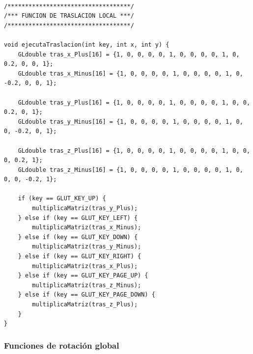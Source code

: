 \documentclass[12pt,a4paper]{article}
\begin{document}
\begin{lstlisting}

/***********************************/
/*** FUNCION DE TRASLACION LOCAL ***/
/***********************************/

void ejecutaTraslacion(int key, int x, int y) {
    GLdouble tras_x_Plus[16] = {1, 0, 0, 0, 0, 1, 0, 0, 0, 0, 1, 0, 0.2, 0, 0, 1};
    GLdouble tras_x_Minus[16] = {1, 0, 0, 0, 0, 1, 0, 0, 0, 0, 1, 0, -0.2, 0, 0, 1};

    GLdouble tras_y_Plus[16] = {1, 0, 0, 0, 0, 1, 0, 0, 0, 0, 1, 0, 0, 0.2, 0, 1};
    GLdouble tras_y_Minus[16] = {1, 0, 0, 0, 0, 1, 0, 0, 0, 0, 1, 0, 0, -0.2, 0, 1};

    GLdouble tras_z_Plus[16] = {1, 0, 0, 0, 0, 1, 0, 0, 0, 0, 1, 0, 0, 0, 0.2, 1};
    GLdouble tras_z_Minus[16] = {1, 0, 0, 0, 0, 1, 0, 0, 0, 0, 1, 0, 0, 0, -0.2, 1};

    if (key == GLUT_KEY_UP) {
        multiplicaMatriz(tras_y_Plus);
    } else if (key == GLUT_KEY_LEFT) {
        multiplicaMatriz(tras_x_Minus);
    } else if (key == GLUT_KEY_DOWN) {
        multiplicaMatriz(tras_y_Minus);
    } else if (key == GLUT_KEY_RIGHT) {
        multiplicaMatriz(tras_x_Plus);
    } else if (key == GLUT_KEY_PAGE_UP) {
        multiplicaMatriz(tras_z_Minus);
    } else if (key == GLUT_KEY_PAGE_DOWN) {
        multiplicaMatriz(tras_z_Plus);
    }
}

\end{lstlisting}

\subsubsection{Funciones de rotación global}
\end{document}

